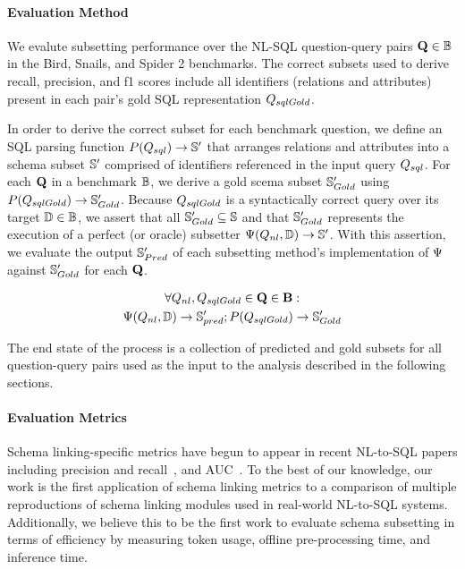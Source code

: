 \paragraph{\textbf{Evaluation Method}}
We evalute subsetting performance over the NL-SQL question-query pairs $\mathbf{Q} \in \mathbb{B}$ in the Bird, Snails, and Spider 2 benchmarks.
The correct subsets used to derive recall, precision, and f1 scores include all identifiers (relations and attributes) present in each pair's gold SQL representation $Q_{sqlGold}$.

In order to derive the correct subset for each benchmark question, we define an SQL parsing function $P(Q_{sql}) \rightarrow \mathbb{S}'$ that arranges relations and attributes into a schema subset $\mathbb{S}'$ comprised of identifiers referenced in the input query $Q_{sql}$.
For each $\mathbf{Q}$ in a benchmark $\mathbb{B}$, we derive a gold scema subset $\mathbb{S}'_{Gold}$ using $P(Q_{sqlGold}) \rightarrow \mathbb{S}'_{Gold}$.
Because $Q_{sqlGold}$ is a syntactically correct query over its target $\mathbb{D} \in \mathbb{B}$, we assert that all $\mathbb{S}'_{Gold} \subseteq \mathbb{S}$ and that $\mathbb{S}'_{Gold}$ represents the execution of a perfect (or oracle) subsetter $\Psi(Q_{nl}, \mathbb{D}) \rightarrow \mathbb{S}'$.
With this assertion, we evaluate the output $\mathbb{S}'_{Pred}$ of each subsetting method's implementation of $\Psi$ against $\mathbb{S}'_{Gold}$ for each $\mathbf{Q}$.

\begin{multline}
  \forall Q_{nl}, Q_{sqlGold} \in \mathbf{Q} \in \mathbf{B}: 
  \\ \Psi(Q_{nl}, \mathbb{D}) \rightarrow \mathbb{S}'_{pred}; P(Q_{sqlGold}) \rightarrow \mathbb{S}'_{Gold}
\end{multline}

The end state of the process is a collection of predicted and gold subsets for all question-query pairs used as the input to the analysis described in the following sections. 

\paragraph{\textbf{Evaluation Metrics}}

Schema linking-specific metrics have begun to appear in recent NL-to-SQL papers including precision and recall~\cite{pourreza2024dtssql, kothyari-etal-2023-crush4sql,benchmark-snails, Katsogiannis-Meimarakis2026, maamari2024deathschemalinkingtexttosql}, and AUC~\cite{li2024codes}.
To the best of our knowledge, our work is the first application of schema linking metrics to a comparison of multiple reproductions of schema linking modules used in real-world NL-to-SQL systems.
Additionally, we believe this to be the first work to evaluate schema subsetting in terms of efficiency by measuring token usage, offline pre-processing time, and inference time.


